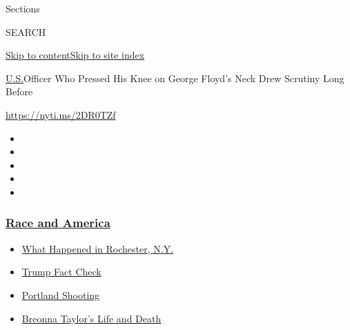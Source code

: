 Sections

SEARCH

\protect\hyperlink{site-content}{Skip to
content}\protect\hyperlink{site-index}{Skip to site index}

\href{/section/us}{U.S.}\textbar{}Officer Who Pressed His Knee on George
Floyd's Neck Drew Scrutiny Long Before

\url{https://nyti.ms/2DR0TZf}

\begin{itemize}
\item
\item
\item
\item
\item
\end{itemize}

\hypertarget{race-and-america}{%
\subsubsection{\texorpdfstring{\href{https://www.nytimes3xbfgragh.onion/news-event/george-floyd-protests-minneapolis-new-york-los-angeles?name=styln-george-floyd\&region=TOP_BANNER\&block=storyline_menu_recirc\&action=click\&pgtype=Article\&impression_id=c102eb50-f29e-11ea-a7f3-993410c7a3e6\&variant=undefined}{Race
and America}}{Race and America}}\label{race-and-america}}

\begin{itemize}
\tightlist
\item
  \href{https://www.nytimes3xbfgragh.onion/2020/09/04/nyregion/rochester-police-daniel-prude.html?name=styln-george-floyd\&region=TOP_BANNER\&block=storyline_menu_recirc\&action=click\&pgtype=Article\&impression_id=c102eb51-f29e-11ea-a7f3-993410c7a3e6\&variant=undefined}{What
  Happened in Rochester, N.Y.}
\item
  \href{https://www.nytimes3xbfgragh.onion/2020/09/01/us/politics/trump-fact-check-protests.html?name=styln-george-floyd\&region=TOP_BANNER\&block=storyline_menu_recirc\&action=click\&pgtype=Article\&impression_id=c102eb52-f29e-11ea-a7f3-993410c7a3e6\&variant=undefined}{Trump
  Fact Check}
\item
  \href{https://www.nytimes3xbfgragh.onion/2020/08/30/us/portland-shooting-explained.html?name=styln-george-floyd\&region=TOP_BANNER\&block=storyline_menu_recirc\&action=click\&pgtype=Article\&impression_id=c1031260-f29e-11ea-a7f3-993410c7a3e6\&variant=undefined}{Portland
  Shooting}
\item
  \href{https://www.nytimes3xbfgragh.onion/2020/08/30/us/breonna-taylor-police-killing.html?name=styln-george-floyd\&region=TOP_BANNER\&block=storyline_menu_recirc\&action=click\&pgtype=Article\&impression_id=c1031261-f29e-11ea-a7f3-993410c7a3e6\&variant=undefined}{Breonna
  Taylor's Life and Death}
\end{itemize}

